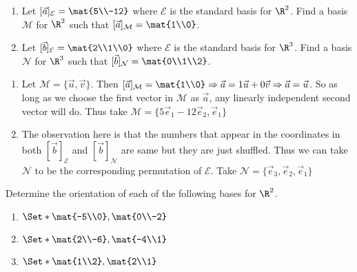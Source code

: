 \begin{exercises}
\begin{problist}
		\prob
		\begin{enumerate}
			\item Let $[\vec a]_{\mathcal E}=\mat{5\\-12}$ where $\mathcal
				E$ is the standard basis for $\R^{2}$. Find a
				basis $\mathcal M$ for $\R^{2}$ such that
				$[\vec a]_{\mathcal M}=\mat{1\\0}$.

			\item Let $[\vec b]_{\mathcal E}=\mat{2\\1\\0}$ where $\mathcal
				E$ is the standard basis for $\R^{3}$. Find a
				basis $\mathcal N$ for $\R^{3}$ such that
				$[\vec b]_{\mathcal N}=\mat{0\\1\\2}$.
		\end{enumerate}
		\begin{solution}
			\begin{enumerate}
				\item Let $\mathcal{M} = \{ \vec{u}, \vec{v}\}$. Then $[\vec{a}]_{\mathcal{M}} = \mat{1\\0} \Rightarrow \vec{a} = 1 \vec{u} + 0 
					\vec{v} \Rightarrow \vec{a} = \vec{u}$. So as long as we choose the first vector in $\mathcal{M}$ as $\vec{a}$, any 
					linearly independent second vector will do. Thus take $\mathcal{M} = \{5\vec{e}_1 - 12 \vec{e}_2 , \vec{e}_1 \}$
				\item The observation here is that the numbers that appear in the coordinates in both $[\vec{b}]_{\mathcal{E}}$ and 
					$[\vec{b}]_{\mathcal{N}}$ are same but they are just shuffled. Thus we can take $\mathcal{N}$ to be the corresponding 
					permutation of  $\mathcal{E}$. Take $\mathcal{N} = \{ \vec{e}_3, \vec{e}_2, \vec{e}_1\}$
			\end{enumerate}
		\end{solution}

		\prob Determine the orientation of each of the following bases
		for $\R^{2}$.
		\begin{enumerate}
			\item $\Set*{\mat{-5\\0},\mat{0\\-2}}$

			\item $\Set*{\mat{2\\-6},\mat{-4\\1}}$

			\item $\Set*{\mat{1\\2},\mat{2\\1}}$


\end{enumerate}
\end{problist}
\end{exercises}
